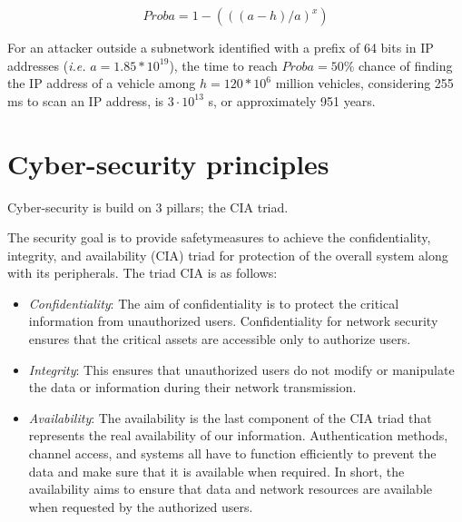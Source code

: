 \begin{equation}
Proba = 1 - (((a-h)/a)^x)
\label{one}
\end{equation}

For an attacker outside a subnetwork identified with a prefix of 64
bits in IP addresses (\emph{i.e.} $a=1.85*10^{19}$), the time to reach
$Proba=50\%$ chance of finding the IP address of a vehicle among
$h=120*10^6$ million vehicles, considering 255 ms to scan an IP
address, is $3 \cdot 10^{13}$ s, or approximately 951 years.


\section {Cyber-security principles}
\medskip
{\Huge C}yber-security is build on 3 pillars; the CIA triad.


The security goal is to provide safetymeasures to achieve the confidentiality, integrity, and availability (CIA) triad for protection of the overall system along with its peripherals. The triad CIA is as follows:
\begin{itemize}
    \setlength\itemsep{1em}
    \item \emph{Confidentiality}: The aim of confidentiality is to protect the critical information from unauthorized users. Confidentiality for network security ensures that the critical assets are accessible only to authorize users.
    \item \emph{Integrity}: This ensures that unauthorized users do not modify or manipulate the data or information during their network transmission.
    \item \emph{Availability}: The availability is the last component of the CIA triad that represents the real availability of our information. Authentication methods, channel access, and systems all have to function efficiently to prevent the data and make sure that it is available when required. In short, the availability aims to ensure that data and network resources are available when requested by the authorized users.    
\end{itemize}



